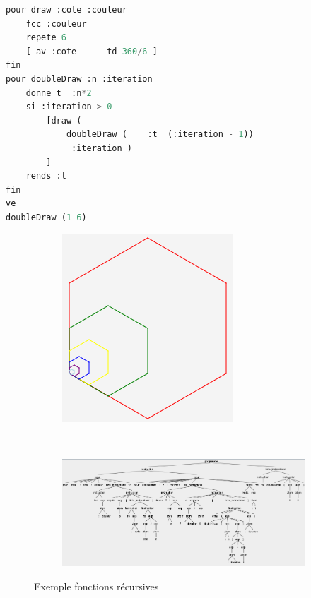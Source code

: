\documentclass[a4paper,11pt]{article}
\begin{document}
\begin{lstlisting}[language=Python]
pour draw :cote :couleur
	fcc :couleur
	repete 6 
	[ av :cote  	td 360/6 ]
fin
pour doubleDraw :n :iteration
	donne t  :n*2
	si :iteration > 0 
		[draw (
			doubleDraw (	:t  (:iteration - 1))
			 :iteration )
		]
	rends :t
fin
ve
doubleDraw (1 6)
\end{lstlisting}
\begin{figure}[!h]
	\centering
	\begin{subfigure}[t]{.2\textwidth}
		\includegraphics[width=\textwidth]{img/function_figure}
	\end{subfigure}
	~
	\begin{subfigure}[t]{\textwidth}
		\includegraphics[width=\textwidth]{img/function_tree}
	\end{subfigure}
	\caption{Exemple fonctions récursives}
\end{figure}

\end{document}
